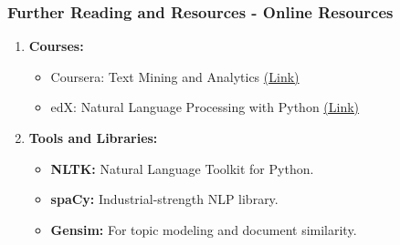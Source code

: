 \documentclass[aspectratio=169]{beamer}
\begin{document}
\begin{frame}[fragile]
    \frametitle{Further Reading and Resources - Online Resources}
    \begin{enumerate}
        \item \textbf{Courses:}
        \begin{itemize}
            \item Coursera: Text Mining and Analytics \href{https://www.coursera.org/learn/text-mining}{(Link)}
            \item edX: Natural Language Processing with Python \href{https://www.edx.org/course/natural-language-processing-with-python}{(Link)}
        \end{itemize}
        \item \textbf{Tools and Libraries:}
        \begin{itemize}
            \item \textbf{NLTK:} Natural Language Toolkit for Python.
            \item \textbf{spaCy:} Industrial-strength NLP library.
            \item \textbf{Gensim:} For topic modeling and document similarity.
        \end{itemize}
    \end{enumerate}
\end{frame}
\end{document}
